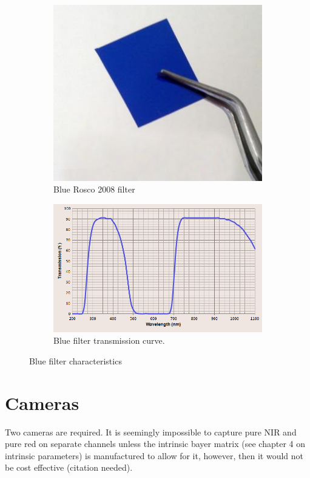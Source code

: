 \begin{figure}[H]
\begin{subfigure}{0.5\textwidth}
\centering
\includegraphics[scale=0.45]{images/blue_filter.jpg}
\caption{Blue Rosco 2008 filter \cite{blue_filter}}
\label{fig:blue_filter}
\end{subfigure}
\begin{subfigure}{0.5\textwidth}
\centering
\includegraphics[scale=0.42]{images/superblueinfraredfiltercurve.png}
\caption{Blue filter transmission curve.}
\label{fig:blue_curve}
\end{subfigure}
\caption{Blue filter characteristics \cite{blue_curve}}
\label{fig:blue_character}
\end{figure}

\section{Cameras}

Two cameras are required. It is seemingly impossible to capture pure NIR and pure red on separate channels unless the intrinsic bayer matrix (see chapter 4 on intrinsic parameters) is manufactured to allow for it, however, then it would not be cost effective (citation needed).\\

